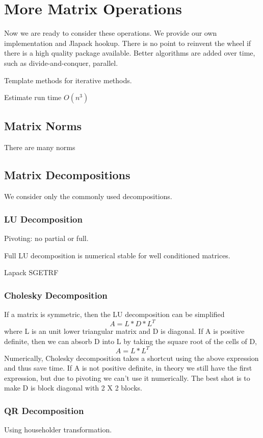 \chapter{More Matrix Operations}
\minitoc
Now we are ready to consider these operations. We provide our own implementation and Jlapack hookup. There is no point to reinvent the wheel if there is a high quality package available. Better algorithms are added over time, such as divide-and-conquer, parallel. 

Template methods for iterative methods.

Estimate run time $O(n^3)$

\section{Matrix Norms}
There are many norms

\section{Matrix Decompositions}
We consider only the commonly used decompositions.

\subsection{LU Decomposition}
Pivoting: no partial or full.

Full LU decomposition is numerical stable for well conditioned matrices.

Lapack SGETRF

\subsection{Cholesky Decomposition}
If a matrix is symmetric, then the LU decomposition can be simplified
\[A = L * D * L^T\]
where L is an unit lower triangular matrix and D is diagonal. If A is positive definite, then we can absorb D into L by taking the square root of the cells of D, \[A= L * L^T\]
Numerically, Cholesky decomposition takes a shortcut using the above expression and thus save time. If A is not positive definite, in theory we still have the first expression, but due to pivoting we can't use it numerically. The best shot is to make D is block diagonal with 2 X 2 blocks.
\subsection{QR Decomposition}
Using householder transformation.

